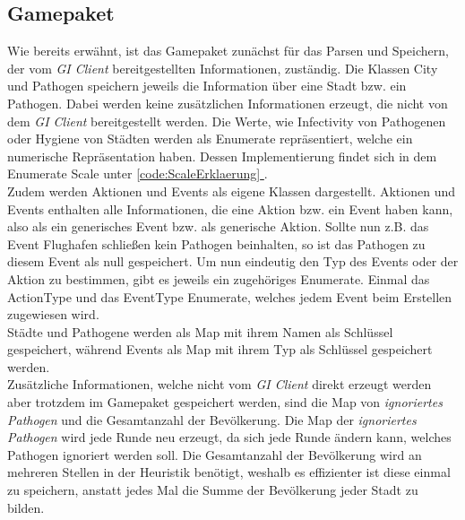 \documentclass{article}
\newcommand{\fullref}[1]{\hyperref[{#1}]{\ref{#1} \nameref{#1}}} %
\newcommand{\gquote}[1]{\glqq #1\grqq} %
\let\oldgls\gls
\renewcommand{\gls}[1]{\emph{\oldgls{#1}}} %
\begin{document}
\subsection{Gamepaket}
Wie bereits erwähnt, ist das Gamepaket zunächst für das Parsen und Speichern, der vom \gls{GI Client} bereitgestellten Informationen, zuständig. Die Klassen City und Pathogen speichern jeweils die Information über eine Stadt bzw. ein Pathogen. Dabei werden keine zusätzlichen Informationen erzeugt, die nicht von dem \gls{GI Client} bereitgestellt werden. Die Werte, wie \gquote{Infectivity} von Pathogenen oder \gquote{Hygiene} von Städten werden als Enumerate repräsentiert, welche ein numerische Repräsentation haben. Dessen Implementierung findet sich in dem Enumerate \gquote{Scale} unter \fullref{code:ScaleErklaerung}. \\
Zudem werden Aktionen und Events als eigene Klassen dargestellt. Aktionen und Events enthalten alle Informationen, die eine Aktion bzw. ein Event haben kann, also als ein \gquote{generisches Event} bzw. als \gquote{generische Aktion}. Sollte nun z.B. das Event \gquote{Flughafen schließen} kein Pathogen beinhalten, so ist das Pathogen zu diesem Event als \gquote{null} gespeichert. Um nun eindeutig den Typ des Events oder der Aktion zu bestimmen, gibt es jeweils ein zugehöriges Enumerate. Einmal das \gquote{ActionType} und das \gquote{EventType} Enumerate, welches jedem Event beim Erstellen zugewiesen wird. \\
Städte und Pathogene werden als Map mit ihrem Namen als Schlüssel gespeichert, während Events als Map mit ihrem Typ als Schlüssel gespeichert werden.\\
Zusätzliche Informationen, welche nicht vom \gls{GI Client} direkt erzeugt werden aber trotzdem im Gamepaket gespeichert werden, sind die Map von \gls{ignoriertes Pathogen} und die Gesamtanzahl der Bevölkerung. Die Map der \gls{ignoriertes Pathogen} wird jede Runde neu erzeugt, da sich jede Runde ändern kann, welches Pathogen ignoriert werden soll.
Die Gesamtanzahl der Bevölkerung wird an mehreren Stellen in der Heuristik benötigt, weshalb es effizienter ist diese einmal zu speichern, anstatt jedes Mal die Summe der Bevölkerung jeder Stadt zu bilden.
\end{document}
